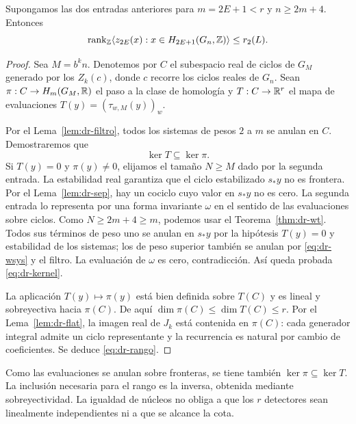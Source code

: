 \begin{teorema}
\label{thm:dr-rango}
Supongamos las dos entradas anteriores para $m=2E+1<r$ y $n\ge2m+4$. Entonces
\begin{equation}
 \operatorname{rank}_{\mathbb{Z}}\langle z_{2E}(x):x\in H_{2E+1}(G_n,\mathbb{Z})\rangle\le r_2(L).
 \label{eq:dr-rango}
\end{equation}
\end{teorema}
\begin{proof}
Sea $M=b^kn$. Denotemos por $C$ el subespacio real de ciclos de $G_M$ generado por los $Z_k(c)$, donde $c$ recorre los ciclos reales de $G_n$. Sean $\pi:C\to H_m(G_M,\mathbb{R})$ el paso a la clase de homología y $T:C\to\mathbb{R}^r$ el mapa de evaluaciones $T(y)=(\tau_{w,M}(y))_w$.

Por el Lema~\ref{lem:dr-filtro}, todos los sistemas de pesos $2$ a $m$ se anulan en $C$. Demostraremos que
\begin{equation}
 \ker T\subseteq\ker\pi.
 \label{eq:dr-kernel}
\end{equation}
Si $T(y)=0$ y $\pi(y)\ne0$, elijamos el tamaño $N\ge M$ dado por la segunda entrada. La estabilidad real garantiza que el ciclo estabilizado $s_*y$ no es frontera. Por el Lema~\ref{lem:dr-sep}, hay un cociclo cuyo valor en $s_*y$ no es cero. La segunda entrada lo representa por una forma invariante $\omega$ en el sentido de las evaluaciones sobre ciclos. Como $N\ge2m+4\ge m$, podemos usar el Teorema~\ref{thm:dr-wt}. Todos sus términos de peso uno se anulan en $s_*y$ por la hipótesis $T(y)=0$ y estabilidad de los sistemas; los de peso superior también se anulan por \eqref{eq:dr-wsys} y el filtro. La evaluación de $\omega$ es cero, contradicción. Así queda probada \eqref{eq:dr-kernel}.

La aplicación $T(y)\mapsto\pi(y)$ está bien definida sobre $T(C)$ y es lineal y sobreyectiva hacia $\pi(C)$. De aquí $\dim\pi(C)\le\dim T(C)\le r$. Por el Lema~\ref{lem:dr-flat}, la imagen real de $J_k$ está contenida en $\pi(C)$: cada generador integral admite un ciclo representante y la recurrencia es natural por cambio de coeficientes. Se deduce \eqref{eq:dr-rango}.
\end{proof}

Como las evaluaciones se anulan sobre fronteras, se tiene también $\ker\pi\subseteq\ker T$. La inclusión necesaria para el rango es la inversa, obtenida mediante sobreyectividad. La igualdad de núcleos no obliga a que los $r$ detectores sean linealmente independientes ni a que se alcance la cota.

